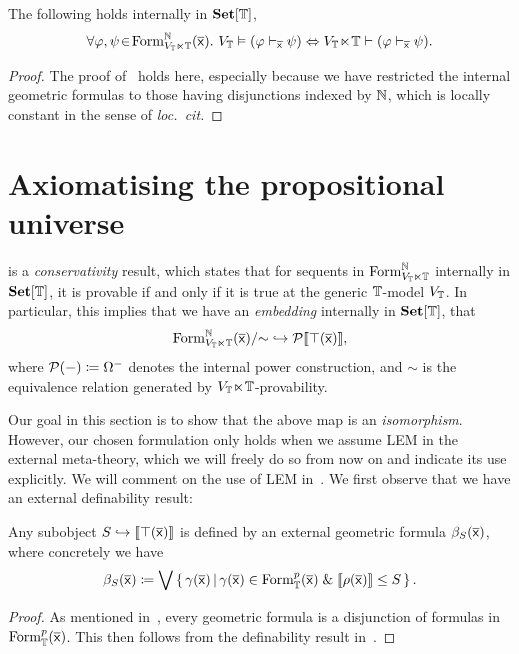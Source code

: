 \begin{theorem}[Nullstellensatz]\label{thm:Nullstellensatz}
  The following holds internally in $\mathbf{Set}[\mathbb{T}]$,
  \[ \forall \varphi,\psi\!\in\!\mathrm{Form}^{\mathbb{N}}_{V_{\mathbb{T}} \ltimes \mathbb{T}}(\overline{\mathsf{x}}).\  V_{\mathbb{T}} \vDash (\varphi \vdash_{\overline{\mathsf{x}}} \psi) \Leftrightarrow V_{\mathbb{T}}\hspace{-.4ex}\ltimes\hspace{-.4ex}\mathbb{T} \vdash (\varphi \vdash_{\overline{\mathsf{x}}} \psi). \]
\end{theorem}
\begin{proof}
  The proof of~\citet[Thm.~3.7]{blechschmidt_general_2020} holds here, especially because we have restricted the internal geometric formulas to those having disjunctions indexed by $\mathbb{N}$, which is locally constant in the sense of \emph{loc.\ cit.}
\end{proof}


\section{Axiomatising the propositional universe}

 is a \emph{conservativity} result, which states that for sequents in $\mathrm{Form}^{\mathbb{N}}_{V_{\mathbb{T}}\ltimes\mathbb{T}}$ internally in $\mathbf{Set}[\mathbb{T}]$, it is provable if and only if it is true at the generic $\mathbb{T}$-model $V_{\mathbb{T}}$. In particular, this implies that we have an \emph{embedding} internally in $\mathbf{Set}[\mathbb{T}]$, that
\[ \mathrm{Form}^{\mathbb{N}}_{V_{\mathbb{T}}\ltimes\mathbb{T}}(\overline{\mathsf{x}})/\mathord{\sim} \hookrightarrow \mathcal{P}\llbracket\top(\overline{\mathsf{x}})\rrbracket, \]
where $\mathcal{P}(-) \coloneq \Omega^-$ denotes the internal power construction, and $\sim$ is the equivalence relation generated by $V_{\mathbb{T}}\hspace{-.4ex}\ltimes\hspace{-.4ex}\mathbb{T}$-provability. 

Our goal in this section is to show that the above map is an \emph{isomorphism}. However, our chosen formulation only holds when we assume \gls{LEM} in the external meta-theory, which we will freely do so from now on and indicate its use explicitly. We will comment on the use of \gls{LEM} in~. We first observe that we have an external definability result:

\begin{lemma}\label{lem:externaldef}
  Any subobject $S \hookrightarrow \llbracket\top(\overline{\mathsf{x}})\rrbracket$ is defined by an external geometric formula $\beta_S(\overline{\mathsf{x}})$, where concretely we have 
  \[ \beta_S(\overline{\mathsf{x}}) \coloneq \bigvee\left\{\,\gamma(\overline{\mathsf{x}})\,\middle|\,\gamma(\overline{\mathsf{x}}) \in \mathrm{Form}^p_{\mathbb{T}}(\overline{\mathsf{x}}) \;\&\; \llbracket\rho(\overline{\mathsf{x}})\rrbracket \le S\,\right\}. \]
\end{lemma}
\begin{proof}
  As mentioned in~, every geometric formula is a disjunction of formulas in $\mathrm{Form}^p_{\mathbb{T}}(\overline{\mathsf{x}})$. This then follows from the definability result in~\citet[Thm.~2.4]{caramello2012universal}. 
\end{proof}

